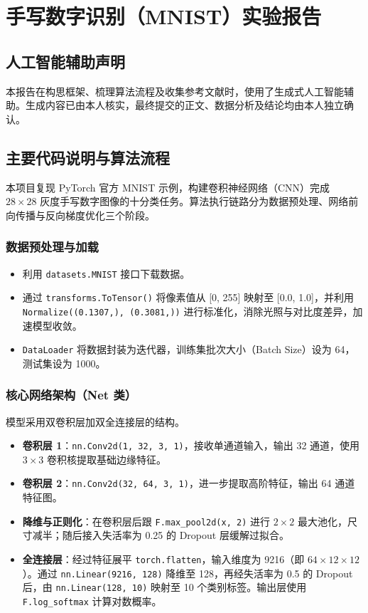 \chapter{手写数字识别（MNIST）实验报告}

\section*{人工智能辅助声明}
本报告在构思框架、梳理算法流程及收集参考文献时，使用了生成式人工智能辅助。生成内容已由本人核实，最终提交的正文、数据分析及结论均由本人独立确认。

\section{主要代码说明与算法流程}
本项目复现 PyTorch 官方 MNIST 示例，构建卷积神经网络（CNN）完成 $28 \times 28$ 灰度手写数字图像的十分类任务。算法执行链路分为数据预处理、网络前向传播与反向梯度优化三个阶段。

\subsection{数据预处理与加载}
\begin{itemize}
    \item 利用 \texttt{datasets.MNIST} 接口下载数据。
    \item 通过 \texttt{transforms.ToTensor()} 将像素值从 [0, 255] 映射至 [0.0, 1.0]，并利用 \texttt{Normalize((0.1307,), (0.3081,))} 进行标准化，消除光照与对比度差异，加速模型收敛。
    \item \texttt{DataLoader} 将数据封装为迭代器，训练集批次大小（Batch Size）设为 64，测试集设为 1000。
\end{itemize}

\subsection{核心网络架构（Net 类）}
模型采用双卷积层加双全连接层的结构。
\begin{itemize}
    \item \textbf{卷积层 1}：\texttt{nn.Conv2d(1, 32, 3, 1)}，接收单通道输入，输出 32 通道，使用 $3 \times 3$ 卷积核提取基础边缘特征。
    \item \textbf{卷积层 2}：\texttt{nn.Conv2d(32, 64, 3, 1)}，进一步提取高阶特征，输出 64 通道特征图。
    \item \textbf{降维与正则化}：在卷积层后跟 \texttt{F.max\_pool2d(x, 2)} 进行 $2 \times 2$ 最大池化，尺寸减半；随后接入失活率为 0.25 的 Dropout 层缓解过拟合。
    \item \textbf{全连接层}：经过特征展平 \texttt{torch.flatten}，输入维度为 9216（即 $64 \times 12 \times 12$）。通过 \texttt{nn.Linear(9216, 128)} 降维至 128，再经失活率为 0.5 的 Dropout 后，由 \texttt{nn.Linear(128, 10)} 映射至 10 个类别标签。输出层使用 \texttt{F.log\_softmax} 计算对数概率。
\end{itemize}

